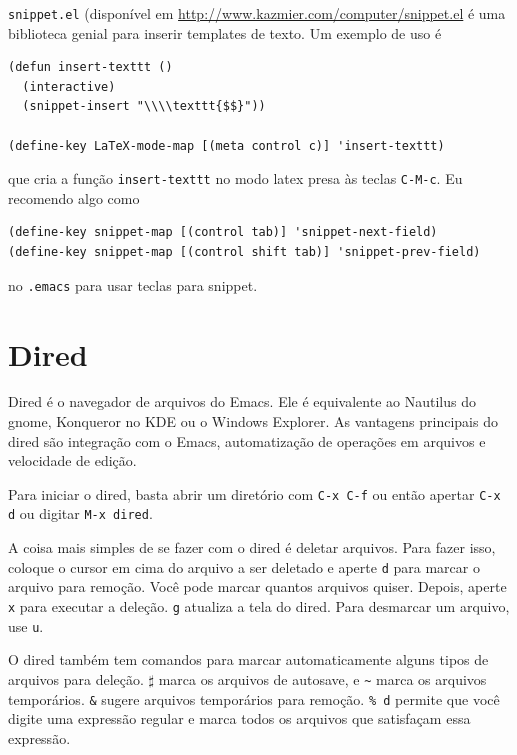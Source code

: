 \documentclass[12pt,brazil]{book}
\begin{document}
\texttt{snippet.el} (disponível em
\url{http://www.kazmier.com/computer/snippet.el} é uma biblioteca
genial para inserir templates de texto. Um exemplo de uso é

\begin{verbatim}
(defun insert-texttt ()
  (interactive)
  (snippet-insert "\\\\texttt{$$}"))

(define-key LaTeX-mode-map [(meta control c)] 'insert-texttt)

\end{verbatim}

que cria a função \texttt{insert-texttt} no modo latex presa às teclas
\texttt{C-M-c}. Eu recomendo algo como

\begin{verbatim}
(define-key snippet-map [(control tab)] 'snippet-next-field)
(define-key snippet-map [(control shift tab)] 'snippet-prev-field)
\end{verbatim}

no \texttt{.emacs} para usar teclas para snippet.

\section{Dired}
\label{sec:dired}

Dired é o navegador de arquivos do Emacs. Ele é equivalente ao
Nautilus do gnome, Konqueror no KDE ou o Windows Explorer. As
vantagens principais do dired são integração com o Emacs,
automatização de operações em arquivos e velocidade de edição.

Para iniciar o dired, basta abrir um diretório com \texttt{C-x C-f} ou
então apertar \texttt{C-x d} ou digitar \texttt{M-x dired}.

A coisa mais simples de se fazer com o dired é deletar arquivos. Para
fazer isso, coloque o cursor em cima do arquivo a ser deletado e aperte
\texttt{d} para marcar o arquivo para remoção. Você pode marcar
quantos arquivos quiser. Depois, aperte \texttt{x} para executar a
deleção. \texttt{g} atualiza a tela do dired. Para desmarcar um
arquivo, use \texttt{u}.

O dired também tem comandos para marcar automaticamente alguns
tipos de arquivos para deleção. \texttt{$\sharp$} marca os arquivos de
autosave, e \texttt{\~} marca os arquivos temporários. \texttt{\&}
sugere arquivos temporários para remoção. \texttt{\% d} permite que você
digite uma expressão regular e marca todos os arquivos que satisfaçam
essa expressão.
\end{document}
